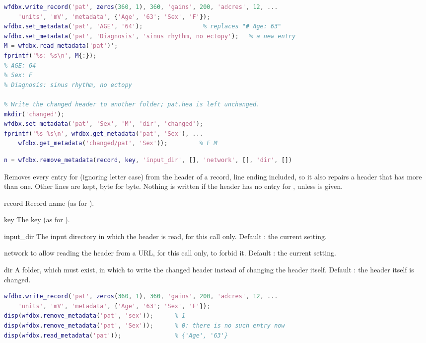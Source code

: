 \begin{lstlisting}[language=Matlab,style=example]
wfdbx.write_record('pat', zeros(360, 1), 360, 'gains', 200, 'adcres', 12, ...
    'units', 'mV', 'metadata', {'Age', '63'; 'Sex', 'F'});
wfdbx.set_metadata('pat', 'AGE', '64');                 % replaces "# Age: 63"
wfdbx.set_metadata('pat', 'Diagnosis', 'sinus rhythm, no ectopy');   % a new entry
M = wfdbx.read_metadata('pat')';
fprintf('%s: %s\n', M{:});
% AGE: 64
% Sex: F
% Diagnosis: sinus rhythm, no ectopy

% Write the changed header to another folder; pat.hea is left unchanged.
mkdir('changed');
wfdbx.set_metadata('pat', 'Sex', 'M', 'dir', 'changed');
fprintf('%s %s\n', wfdbx.get_metadata('pat', 'Sex'), ...
    wfdbx.get_metadata('changed/pat', 'Sex'));         % F M
\end{lstlisting}

\begin{lstlisting}[language=Matlab,style=signature]
n = wfdbx.remove_metadata(record, key, 'input_dir', [], 'network', [], 'dir', [])
\end{lstlisting}
Removes every entry for  (ignoring letter case) from the header of a record,
line ending included, so it also repairs a header that has more than one. Other lines are
kept, byte for byte. Nothing is written if the header has no entry for , unless
 is given.
\begin{params}
\item[record] Record name (as for ).
\item[key] The key (as for ).
\item[input\_dir] The input directory in which the header is read, for this call only.
  Default \code{[]}: the current setting.
\item[network]  to allow reading the header from a URL, for this call only,
   to forbid it. Default \code{[]}: the current setting.
\item[dir] A folder, which must exist, in which to write the changed header instead of
  changing the header itself. Default \code{[]}: the header itself is changed.
\end{params}
\begin{lstlisting}[language=Matlab,style=example]
wfdbx.write_record('pat', zeros(360, 1), 360, 'gains', 200, 'adcres', 12, ...
    'units', 'mV', 'metadata', {'Age', '63'; 'Sex', 'F'});
disp(wfdbx.remove_metadata('pat', 'sex'));      % 1
disp(wfdbx.remove_metadata('pat', 'Sex'));      % 0: there is no such entry now
disp(wfdbx.read_metadata('pat'));               % {'Age', '63'}
\end{lstlisting}

